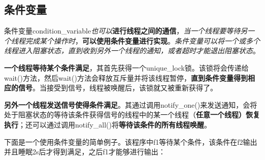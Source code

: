 \documentclass[UTF8,a4paper,12pt]{ctexbook}
\begin{document}
	\subsection{条件变量}
		条件变量condition\_variable\textit{也可以}\textbf{进行线程之间的通信}，\textit{当一个线程要等待另一个线程完成某个操作时}，\textbf{可以使用条件变量进行实现}。\textit{条件变量可以将一个或多个线程进入阻塞状态，直到收到另外一个线程的通知，或者超时才能退出阻塞状态}。
		
		\textbf{一个线程等待某个条件满足}，其首先获得一个unique\_lock锁。该锁将会传递给wait()方法，然后wait()方法会释放互斥量并将该线程暂停，\textbf{直到条件变量得到相应的信号}。当接受到信号，线程被唤醒后，该锁就又被重新获得了。
		
		\textbf{另外一个线程发送信号使得条件满足}。其通过调用notify\_one()来发送通知，会将处于阻塞状态的等待该条件获得信号的线程中的某一个线程（\textbf{任意一个线程）恢复执行}；还可以通过调用notify\_all()将\textbf{等待该条件的所有线程唤醒}。
		
		下面是一个使用条件变量的简单例子。该程序中f1等待某个条件，该条件在f2输出并且睡眠2s后才得到满足，之后f1才能够进行输出：
\end{document}
